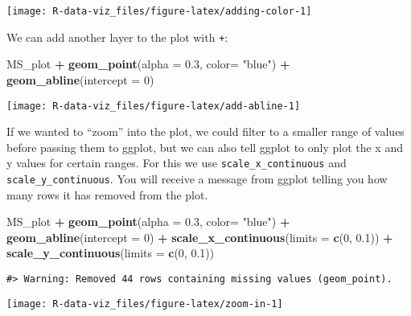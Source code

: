 \documentclass[]{book}
\newenvironment{Shaded}{\begin{snugshade}}{\end{snugshade}}
\newcommand{\DataTypeTok}[1]{\textcolor[rgb]{0.13,0.29,0.53}{#1}}
\newcommand{\DecValTok}[1]{\textcolor[rgb]{0.00,0.00,0.81}{#1}}
\newcommand{\FloatTok}[1]{\textcolor[rgb]{0.00,0.00,0.81}{#1}}
\newcommand{\KeywordTok}[1]{\textcolor[rgb]{0.13,0.29,0.53}{\textbf{#1}}}
\newcommand{\NormalTok}[1]{#1}
\newcommand{\OperatorTok}[1]{\textcolor[rgb]{0.81,0.36,0.00}{\textbf{#1}}}
\newcommand{\StringTok}[1]{\textcolor[rgb]{0.31,0.60,0.02}{#1}}
\begin{document}
\texttt{[image: R-data-viz\_files/figure-latex/adding-color-1]}

We can add another layer to the plot with \texttt{+}:

\begin{Shaded}
\begin{Highlighting}[]
\NormalTok{MS_plot }\OperatorTok{+}\StringTok{ }
\StringTok{  }\KeywordTok{geom_point}\NormalTok{(}\DataTypeTok{alpha =} \FloatTok{0.3}\NormalTok{, }\DataTypeTok{color=} \StringTok{"blue"}\NormalTok{) }\OperatorTok{+}
\StringTok{  }\KeywordTok{geom_abline}\NormalTok{(}\DataTypeTok{intercept =} \DecValTok{0}\NormalTok{)}
\end{Highlighting}
\end{Shaded}

\texttt{[image: R-data-viz\_files/figure-latex/add-abline-1]}

If we wanted to ``zoom'' into the plot, we could filter to a smaller range of values before passing them to ggplot, but we can also tell ggplot to only plot the x and y values for certain ranges. For this we use \texttt{scale\_x\_continuous} and \texttt{scale\_y\_continuous}. You will receive a message from ggplot telling you how many rows it has removed from the plot.

\begin{Shaded}
\begin{Highlighting}[]
\NormalTok{MS_plot }\OperatorTok{+}\StringTok{ }
\StringTok{  }\KeywordTok{geom_point}\NormalTok{(}\DataTypeTok{alpha =} \FloatTok{0.3}\NormalTok{, }\DataTypeTok{color=} \StringTok{"blue"}\NormalTok{) }\OperatorTok{+}
\StringTok{  }\KeywordTok{geom_abline}\NormalTok{(}\DataTypeTok{intercept =} \DecValTok{0}\NormalTok{) }\OperatorTok{+}\StringTok{ }
\StringTok{  }\KeywordTok{scale_x_continuous}\NormalTok{(}\DataTypeTok{limits =} \KeywordTok{c}\NormalTok{(}\DecValTok{0}\NormalTok{, }\FloatTok{0.1}\NormalTok{)) }\OperatorTok{+}
\StringTok{  }\KeywordTok{scale_y_continuous}\NormalTok{(}\DataTypeTok{limits =} \KeywordTok{c}\NormalTok{(}\DecValTok{0}\NormalTok{, }\FloatTok{0.1}\NormalTok{)) }
\end{Highlighting}
\end{Shaded}

\begin{verbatim}
#> Warning: Removed 44 rows containing missing values (geom_point).
\end{verbatim}

\texttt{[image: R-data-viz\_files/figure-latex/zoom-in-1]}
\end{document}
